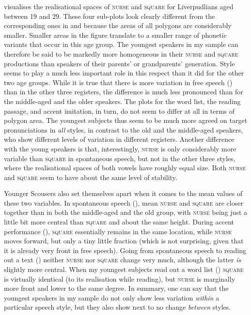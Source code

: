  visualises the realisational spaces of \textsc{nurse} and \textsc{square} for Liverpudlians aged between 19 and 29.
These four sub-plots look clearly different from the corresponding ones in  and  because the areas of all polygons are considerably smaller.
Smaller areas in the figure translate to a smaller range of phonetic variants that occur in this age group.
The youngest speakers in my sample can therefore be said to be markedly more homogeneous in their \textsc{nurse} and \textsc{square} productions than speakers of their parents' or grandparents' generation.
Style seems to play a much less important role in this respect than it did for the other two age groups.
While it is true that there is more variation in free speech () than in the other three registers, the difference is much less pronounced than for the middle-aged and the older speakers.
The plots for the word list, the reading passage, and accent imitation, in turn, do not seem to differ at all in terms of polygon area.
The youngest subjects thus seem to be much more agreed on target pronunciations in \emph{all} styles, in contrast to the old and the middle-aged speakers, who show different levels of variation in different registers.
Another difference with the young speakers is that, interestingly, \textsc{nurse} is only considerably more variable than \textsc{square} in spontaneous speech, but not in the other three styles, where the realisational spaces of both vowels have roughly equal size.
Both \textsc{nurse} and \textsc{square} seem to have about the same level of stability.

Younger Scousers also set themselves apart when it comes to the mean values of these two variables.
In spontaneous speech (), mean \textsc{nurse} and \textsc{square} are closer together than in both the middle-aged and the old group, with \textsc{nurse} being just a little bit more central than \textsc{square} and about the same height.
During accent performance (), \textsc{square} essentially remains in the same location, while \textsc{nurse} moves forward, but only a tiny little fraction (which is not surprising, given that it is already very front in free speech).
Going from spontaneous speech to reading out a text () neither \textsc{nurse} nor \textsc{square} change very much, although the latter \emph{is} slightly more central.
When my youngest subjects read out a word list () \textsc{square} is virtually identical (to its realisation while reading), but \textsc{nurse} is marginally more front and lower to the same degree.
In summary, one can say that the youngest speakers in my sample do not only show less variation \emph{within} a particular speech style, but they also show next to no change \emph{between} styles.

